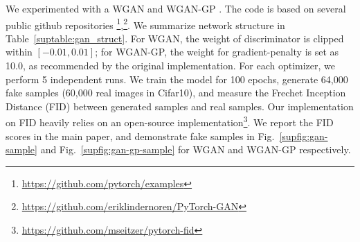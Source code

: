 \documentclass{article}
\begin{document}
We experimented with a WGAN \cite{arjovsky2017wasserstein} and WGAN-GP \cite{gulrajani2017improved}. The code is based on several public github repositories \footnote{\url{https://github.com/pytorch/examples}},\footnote{\url{https://github.com/eriklindernoren/PyTorch-GAN}}. We summarize network structure in Table~\ref{suptable:gan_struct}. For WGAN, the weight of discriminator is clipped within $[-0.01, 0.01]$; for WGAN-GP, the weight for gradient-penalty is set as 10.0, as recommended by the original implementation. For each optimizer, we perform 5 independent runs. We train the model for 100 epochs, generate 64,000 fake samples (60,000 real images in Cifar10), and measure the Frechet Inception Distance (FID) \cite{heusel2017gans} between generated samples and real samples. Our implementation on FID heavily relies on an open-source implementation\footnote{\url{https://github.com/mseitzer/pytorch-fid}}. We report the FID scores in the main paper, and demonstrate fake samples in Fig.~\ref{supfig:gan-sample} and Fig.~\ref{supfig:gan-gp-sample} for WGAN and WGAN-GP respectively.
\end{document}
